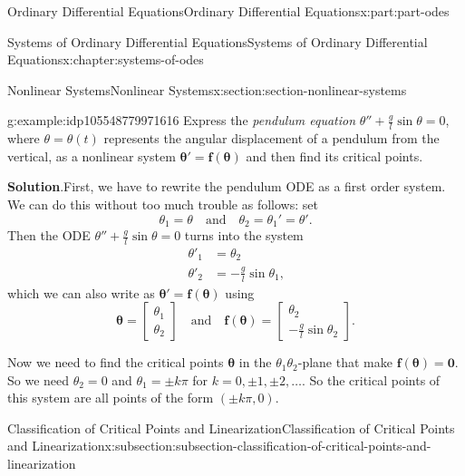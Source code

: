 \documentclass[oneside,10pt,]{book}
\newcommand{\blocktitlefont}{\relax}
\numberwithin{equation}{part}
\renewcommand{\vec}[1]{\mathbf{#1}}
\newcommand{\vecm}[1]{\bm{#1}}
\renewcommand{\vecm}[1]{\boldsymbol{#1}}
\newcommand{\amp}{&}
\begin{document}
\begin{partptx}{Ordinary Differential Equations}{}{Ordinary Differential Equations}{}{}{x:part:part-odes}
\begin{chapterptx}{Systems of Ordinary Differential Equations}{}{Systems of Ordinary Differential Equations}{}{}{x:chapter:systems-of-odes}
\begin{sectionptx}{Nonlinear Systems}{}{Nonlinear Systems}{}{}{x:section:section-nonlinear-systems}
\begin{introduction}{}
\begin{example}{}{g:example:idp105548779971616}
Express the \emph{pendulum equation} \(\theta''+\frac{g}{l}\sin\theta=0\), where \(\theta=\theta(t)\) represents the angular displacement of a pendulum from the vertical, as a nonlinear system \(\vecm{\theta}' = \vec{f}(\vecm{\theta})\) and then find its critical points.%
\par\smallskip%
\noindent\textbf{\blocktitlefont Solution}.\hypertarget{g:solution:idp105548779973664}{}\quad{}First, we have to rewrite the pendulum ODE as a first order system. We can do this without too much trouble as follows: set%
\begin{equation*}
\theta_{1} = \theta\quad\text{and}\quad\theta_{2} = \theta_{1}' = \theta'\text{.}
\end{equation*}
Then the ODE \(\theta''+\frac{g}{l}\sin\theta = 0\) turns into the system%
\begin{align*}
\theta'_{1} \amp = \theta_{2}\\
\theta'_{2} \amp = -\frac{g}{l}\sin\theta_{1}\text{,}
\end{align*}
which we can also write as \(\boldsymbol{\theta}' = \vec{f}(\boldsymbol{\theta})\) using%
\begin{equation*}
\vecm{\theta} = \begin{bmatrix}\theta_{1} \\ \theta_{2}\end{bmatrix}\quad\text{and}\quad \vec{f}(\vecm{\theta}) = \begin{bmatrix}\theta_{2} \\ -\frac{g}{l}\sin\theta_{2}\end{bmatrix}.
\end{equation*}
%
\par
Now we need to find the critical points \(\vecm{\theta}\) in the \(\theta_{1}\theta_{2}\)-plane that make \(\vec{f}(\vecm{\theta}) = \vec{0}\). So we need \(\theta_{2} = 0\) and \(\theta_{1} = \pm k\pi\) for \(k=0,\pm1,\pm2,\dots\). So the critical points of this system are all points of the form \((\pm k\pi,0)\).%
\end{example}
\end{introduction}%
%
%
\typeout{************************************************}
\typeout{************************************************}
%
\begin{subsectionptx}{Classification of Critical Points and Linearization}{}{Classification of Critical Points and Linearization}{}{}{x:subsection:subsection-classification-of-critical-points-and-linearization}

\end{subsectionptx}
\end{sectionptx}
\end{chapterptx}
\end{partptx}
\end{document}
